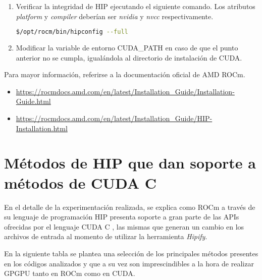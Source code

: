 \begin{enumerate}
\item Verificar la integridad de HIP ejecutando el siguiente comando. Los atributos \textit{platform} y \textit{compiler} deberían ser \textit{nvidia} y \textit{nvcc} respectivamente.

\begin{lstlisting}[language=bash]
$/opt/rocm/bin/hipconfig --full
\end{lstlisting}

\item Modificar la variable de entorno CUDA\_PATH en caso de que el punto anterior no se cumpla, igualándola al directorio de instalación de CUDA.
\end{enumerate}

Para mayor información, referirse a la documentación oficial de AMD ROCm.
\begin{itemize}
    \item \hyperlink{https://rocmdocs.amd.com/en/latest/Installation_Guide/Installation-Guide.html}{https://rocmdocs.amd.com/en/latest/Installation\_Guide/Installation-Guide.html}
    \item \hyperlink{https://rocmdocs.amd.com/en/latest/Installation_Guide/HIP-Installation.html}{https://rocmdocs.amd.com/en/latest/Installation\_Guide/HIP-Installation.html}
\end{itemize}

\newpage

\section{Métodos de HIP que dan soporte a métodos de CUDA C}

En el detalle de la experimentación realizada, se explica como ROCm a través de su lenguaje de programación HIP presenta soporte a gran parte de las APIs ofrecidas por el lenguaje CUDA C \cite{support}, las mismas que generan un cambio en los archivos de entrada al momento de utilizar la herramienta \textit{Hipify}. 

En la siguiente tabla se plantea una selección de los principales métodos presentes en los códigos analizados y que a su vez son imprescindibles a la hora de realizar GPGPU tanto en ROCm como en CUDA.


